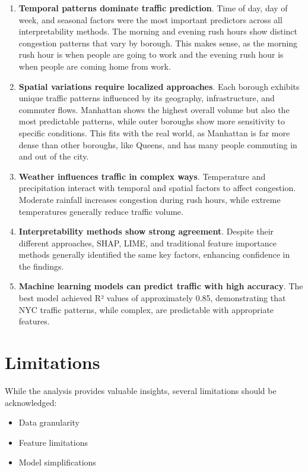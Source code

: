 \documentclass[
  letterpaper,
  DIV=11,
  numbers=noendperiod]{scrreprt}
\providecommand{\tightlist}{%
  \setlength{\itemsep}{0pt}\setlength{\parskip}{0pt}}\usepackage{longtable,booktabs,array}
\begin{document}
\begin{enumerate}
\def\labelenumi{\arabic{enumi}.}
\item
  \textbf{Temporal patterns dominate traffic prediction}. Time of day,
  day of week, and seasonal factors were the most important predictors
  across all interpretability methods. The morning and evening rush
  hours show distinct congestion patterns that vary by borough. This
  makes sense, as the morning rush hour is when people are going to work
  and the evening rush hour is when people are coming home from work.
\item
  \textbf{Spatial variations require localized approaches}. Each borough
  exhibits unique traffic patterns influenced by its geography,
  infrastructure, and commuter flows. Manhattan shows the highest
  overall volume but also the most predictable patterns, while outer
  boroughs show more sensitivity to specific conditions. This fits with
  the real world, as Manhattan is far more dense than other boroughs,
  like Queens, and has many people commuting in and out of the city.
\item
  \textbf{Weather influences traffic in complex ways}. Temperature and
  precipitation interact with temporal and spatial factors to affect
  congestion. Moderate rainfall increases congestion during rush hours,
  while extreme temperatures generally reduce traffic volume.
\item
  \textbf{Interpretability methods show strong agreement}. Despite their
  different approaches, SHAP, LIME, and traditional feature importance
  methods generally identified the same key factors, enhancing
  confidence in the findings.
\item
  \textbf{Machine learning models can predict traffic with high
  accuracy}. The best model achieved R² values of approximately 0.85,
  demonstrating that NYC traffic patterns, while complex, are
  predictable with appropriate features.
\end{enumerate}

\section{Limitations}\label{limitations}

While the analysis provides valuable insights, several limitations
should be acknowledged:

\begin{itemize}
\tightlist
\item
  Data granularity
\item
  Feature limitations
\item
  Model simplifications
\end{itemize}
\end{document}

